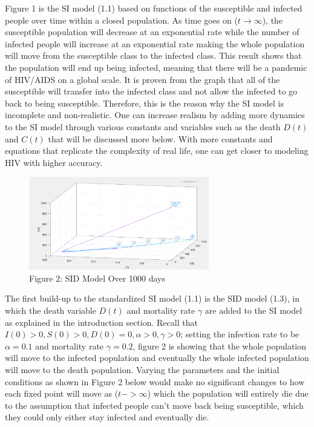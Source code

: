 \documentclass[a4paper, final, 12pt]{article}
\numberwithin{equation}{section}
\begin{document}
Figure 1 is the SI model (1.1) based on functions of the susceptible and infected people over time within a closed population. As time goes on ($t \to \infty$), the susceptible population will decrease at an exponential rate while the number of infected people will increase at an exponential rate making the whole population will move from the susceptible class to the infected class. This result shows that the population will end up being infected, meaning that there will be a pandemic of HIV/AIDS on a global scale. It is proven from the graph that all of the susceptible will transfer into the infected class and not allow the infected to go back to being susceptible. Therefore, this is the reason why the SI model is incomplete and non-realistic. One can increase realism by adding more dynamics to the SI model through various constants and variables such as the death $D(t)$ and $C(t)$ that will be discussed more below. With more constants and equations that replicate the complexity of real life, one can get closer to modeling HIV with higher accuracy. \\

\begin{figure}[!ht] 
    \centering
    \includegraphics[width=0.7\textwidth]{model1.png}
    \caption{Figure 2: SID Model Over 1000 days}
    \label{fig:matrix3}
\end{figure}

The first build-up to the standardized SI model (1.1) is the SID model (1.3), in which the death variable $D(t)$ and mortality rate $\gamma$ are added to the SI model as explained in the introduction section. Recall that $I(0) > 0, S(0) > 0, D(0) = 0, \alpha > 0, \gamma > 0$; setting the infection rate to be $\alpha = 0.1$ and mortality rate $\gamma = 0.2$, figure 2 is showing that the whole population will move to the infected population and eventually the whole infected population will move to the death population. Varying the parameters and the initial conditions as shown in Figure 2 below would make no significant changes to how each fixed point will move as ($t->\infty$) which the population will entirely die due to the assumption that infected people can’t move back being susceptible, which they could only either stay infected and eventually die. \\
\end{document}

